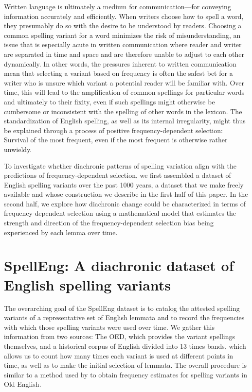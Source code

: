 \documentclass[doc,biblatex]{apa7}
\begin{document}
Written language is ultimately a medium for communication---for conveying information accurately and efficiently. When writers choose how to spell a word, they presumably do so with the desire to be understood by readers. Choosing a common spelling variant for a word minimizes the risk of misunderstanding, an issue that is especially acute in written communication where reader and writer are separated in time and space and are therefore unable to adjust to each other dynamically. In other words, the pressures inherent to written communication mean that selecting a variant based on frequency is often the safest bet for a writer who is unsure which variant a potential reader will be familiar with. Over time, this will lead to the amplification of common spellings for particular words and ultimately to their fixity, even if such spellings might otherwise be cumbersome or inconsistent with the spelling of other words in the lexicon. The standardization of English spelling, as well as its internal irregularity, might thus be explained through a process of positive frequency-dependent selection: Survival of the most frequent, even if the most frequent is otherwise rather unwieldy.

To investigate whether diachronic patterns of spelling variation align with the predictions of frequency-dependent selection, we first assembled a dataset of English spelling variants over the past 1000 years, a dataset that we make freely available and whose construction we describe in the first half of this paper. In the second half, we explore how diachronic change could be characterized in terms of frequency-dependent selection using a mathematical model that estimates the strength and direction of the frequency-dependent selection bias being experienced by each lemma over time.

\section{SpellEng: A diachronic dataset of English spelling variants}

The overarching goal of the SpellEng dataset is to catalog the attested spelling variants of a representative set of English lemmata and to record the frequencies with which those spelling variants were used over time. We gather this information from two sources: The OED, which provides the variant spellings themselves, and a historical corpus of English divided into 13 times bands, which allows us to count how many times each variant is used at different points in time, as well as to make the initial selection of lemmata. The overall procedure is similar to a method used by \textcite{Faulkner:2023} to obtain frequency estimates for spelling variants in Old English.
\end{document}
